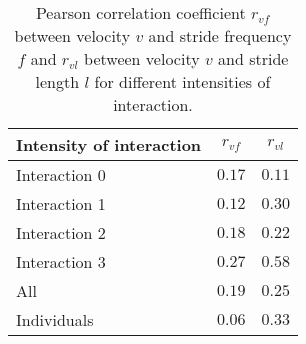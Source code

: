 \begin{table}
\centering
\caption{Pearson correlation coefficient $r_{vf}$ between velocity $v$ and stride frequency $f$ and $r_{vl}$ between velocity $v$ and stride length $l$ for different intensities of interaction.}
\label{tab:pearson_correlation}
\begin{tabular}{lcc}
\toprule
Intensity of interaction & $r_{vf}$ & $r_{vl}$ \\
\midrule
Interaction 0 & $0.17$ & $0.11$ \\
Interaction 1 & $0.12$ & $0.30$ \\
Interaction 2 & $0.18$ & $0.22$ \\
Interaction 3 & $0.27$ & $0.58$ \\
\midrule
All & $0.19$ & $0.25$ \\
Individuals & $0.06$ & $0.33$ \\
\bottomrule
\end{tabular}
\end{table}
